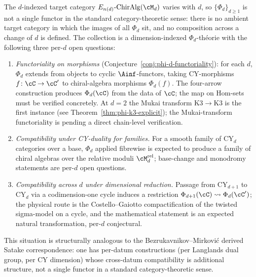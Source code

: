 \begin{remark}
\label{rem:phi-not-unified-functor}
The $d$-indexed target category $E_{n(d)}\text{-}\mathrm{ChirAlg}(\cM_d)$ varies with $d$, so $\{\Phi_d\}_{d \geq 1}$ is not a single functor in the standard category-theoretic sense: there is no ambient target category in which the images of all $\Phi_d$ sit, and no composition across a change of $d$ is defined. The collection is a dimension-indexed $\Phi_d$-th\'eorie with the following three per-$d$ open questions:
\begin{enumerate}[label=\textup{(\roman*)}]
 \item \emph{Functoriality on morphisms} \textup{(}Conjecture~\textup{\ref{conj:phi-d-functoriality}}\textup{):} for each $d$, $\Phi_d$ extends from objects to cyclic $\Ainf$-functors, taking CY-morphisms $f \colon \cC \to \cC'$ to chiral-algebra morphisms $\Phi_d(f)$. The four-arrow construction produces $\Phi_d(\cC)$ from the data of $\cC$; the map on $\mathrm{Hom}$-sets must be verified concretely. At $d = 2$ the Mukai transform $\mathrm{K3} \to \mathrm{K3}$ is the first instance \textup{(}see Theorem~\textup{\ref{thm:phi-k3-explicit}}\textup{);} the Mukai-transform functoriality is pending a direct chain-level verification.
 \item \emph{Compatibility under CY-duality for families.} For a smooth family of CY$_d$ categories over a base, $\Phi_d$ applied fibrewise is expected to produce a family of chiral algebras over the relative moduli $\cM_d^{\mathrm{rel}}$; base-change and monodromy statements are per-$d$ open questions.
 \item \emph{Compatibility across $d$ under dimensional reduction.} Passage from $\mathrm{CY}_{d+1}$ to $\mathrm{CY}_d$ via a codimension-one cycle induces a restriction $\Phi_{d+1}(\cC) \leadsto \Phi_d(\cC')$; the physical route is the Costello--Gaiotto compactification of the twisted sigma-model on a cycle, and the mathematical statement is an expected natural transformation, per-$d$ conjectural.
\end{enumerate}
This situation is structurally analogous to the Bezrukavnikov--Mirkovi\'c derived Satake correspondence: one has per-datum constructions \textup{(}per Langlands dual group, per CY dimension\textup{)} whose cross-datum compatibility is additional structure, not a single functor in a standard category-theoretic sense.
\end{remark}

